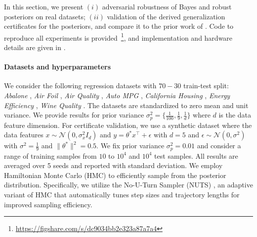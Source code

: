 In this section, we present $(i)$ adversarial robustness of Bayes and robust posteriors on real datasets; $(ii)$ validation of the derived generalization certificates for the posteriors, and compare it to the prior work of \citep{germain2016pac}.
Code to reproduce all experiments is provided~\footnote{\url{https://figshare.com/s/dc9034bb2e323a87a7a4}}, and implementation and hardware details are given in .

\paragraph{Datasets and hyperparameters} %
We consider the following regression datasets with $70-30$ train-test split: \emph{Abalone} \citep{abalone}, \emph{Air Foil} \citep{airfoil}, \emph{Air Quality} \citep{air_quality}, \emph{Auto MPG} \citep{auto_mpg}, \emph{California Housing} \citep{pedregosa2011cali}, \emph{Energy Efficiency} \citep{energy_efficiency}, \emph{Wine Quality} \citep{wine_quality}. The datasets are standardized to zero mean and unit variance. 
We provide results for prior variance $\sigma_p^2 = \{\frac{1}{100}, \frac{1}{9}, \frac{1}{d}\}$ where $d$ is the data feature dimension. %
%
For certificate validation, we use a synthetic dataset where the data features $x \sim \mathcal{N}(0, \sigma_x^2 I_d)$ and $y = \theta^* x^\top + \epsilon$  with $d=5$ and $\epsilon \sim \mathcal{N}(0, \sigma^2)$ with $\sigma^2 = \frac{1}{9}$ and $\| \theta^* \|^2 = 0.5$. We fix prior variance $\sigma_p^2 = 0.01$ and consider a range of training samples from $10$ to $10^4$ and $10^4$ test samples. 
All results are averaged over 5 seeds and reported with standard deviation.
We employ Hamiltonian Monte Carlo (HMC) to efficiently sample from the posterior distribution. Specifically, we utilize the No-U-Turn Sampler (NUTS) \citep{hoffman2014no}, an adaptive variant of HMC that automatically tunes step sizes and trajectory lengths for improved sampling efficiency. 


